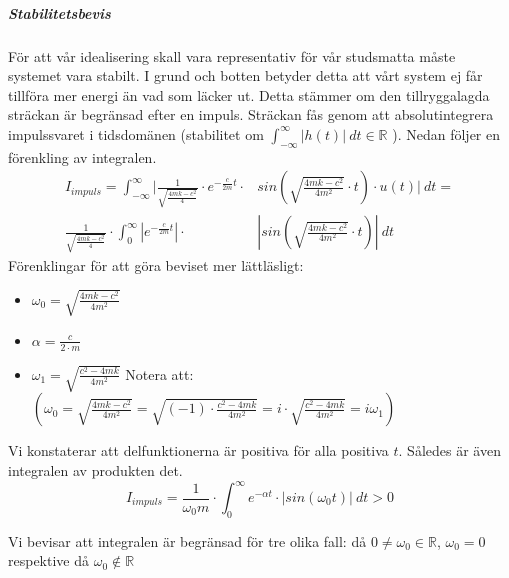 \documentclass[10pt,a4paper]{article}
\begin{document}
\newpage
\subparagraph{Stabilitetsbevis}
För att vår idealisering skall vara representativ för vår studsmatta måste systemet vara stabilt. I grund och botten betyder detta att vårt system ej får tillföra mer energi än vad som läcker ut. Detta stämmer om den tillryggalagda sträckan är begränsad efter en impuls. Sträckan fås genom att absolutintegrera impulssvaret i tidsdomänen (stabilitet om $\int_{-\infty}^{\infty}|h(t)|\ dt\in \mathbb{R}$ ). Nedan följer en förenkling av integralen.
\begin{equation}
\begin{split}
I_{impuls}=\int_{-\infty}^{\infty}| \frac{1}{\sqrt{\frac{4  m  k - c^2}{4}} }  \cdot e^{-\frac{c}{2m}  t} \cdot & sin(\sqrt{\frac{4  m  k - c^2}{4  m^2}} \cdot t) \cdot u(t)| \ dt=\\ \frac{1}{\sqrt{\frac{4  m  k - c^2}{4}} }  \cdot \int_{0}^{\infty}|e^{-\frac{c}{2m}  t}| \cdot & |sin(\sqrt{\frac{4  m  k - c^2}{4  m^2}} \cdot t)| \ dt
\end{split}
\end{equation}
Förenklingar för att göra beviset mer lättläsligt:
\begin{itemize}
\item $\omega_0=\sqrt{\frac{4  m  k - c^2}{4  m^2}}$
\item $\alpha=\frac{c}{2\cdot m}$
\item $\omega_1=\sqrt{\frac{c^2-4  m  k}{4  m^2}}$
\newline
\newline 
Notera att: $\left( \omega_0=\sqrt{\frac{4  m  k-c^2}{4  m^2}}=\sqrt{(-1)\cdot\frac{c^2-4  m  k}{4  m^2}}=i\cdot\sqrt{\frac{c^2-4  m  k}{4  m^2}}=i \omega_1\right)$
\end{itemize}

Vi konstaterar att delfunktionerna är positiva för alla positiva $t$. Således är även integralen av produkten det.
$$I_{impuls}=\frac{1}{\omega_0  m} \cdot \int_{0}^{\infty}e^{-\alpha t}\cdot | sin(\omega_0 t)| \ dt>0$$

Vi bevisar att integralen är begränsad för tre olika fall: då $0\neq\omega_0 \in \mathbb{R}$, $\omega_0=0$ respektive då $\omega_0 \notin \mathbb{R}$
\end{document}
